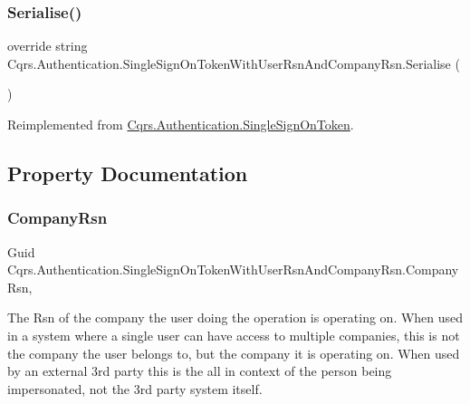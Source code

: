 \subsubsection{\texorpdfstring{Serialise()}{Serialise()}}
{\footnotesize\ttfamily override string Cqrs.\+Authentication.\+Single\+Sign\+On\+Token\+With\+User\+Rsn\+And\+Company\+Rsn.\+Serialise (\begin{DoxyParamCaption}{ }\end{DoxyParamCaption})\hspace{0.3cm}{\ttfamily [virtual]}}



Reimplemented from \hyperlink{classCqrs_1_1Authentication_1_1SingleSignOnToken_a5e859c6c5db5aaa9ef4e8f2086df4604_a5e859c6c5db5aaa9ef4e8f2086df4604}{Cqrs.\+Authentication.\+Single\+Sign\+On\+Token}.



\subsection{Property Documentation}
\mbox{\label{classCqrs_1_1Authentication_1_1SingleSignOnTokenWithUserRsnAndCompanyRsn_ae81ee4a4935b762a1ed2504ea321c517_ae81ee4a4935b762a1ed2504ea321c517}} 
\subsubsection{\texorpdfstring{Company\+Rsn}{CompanyRsn}}
{\footnotesize\ttfamily Guid Cqrs.\+Authentication.\+Single\+Sign\+On\+Token\+With\+User\+Rsn\+And\+Company\+Rsn.\+Company\+Rsn\hspace{0.3cm}{\ttfamily [get]}, {\ttfamily [set]}}



The Rsn of the company the user doing the operation is operating on. When used in a system where a single user can have access to multiple companies, this is not the company the user belongs to, but the company it is operating on. When used by an external 3rd party this is the all in context of the person being impersonated, not the 3rd party system itself. 

